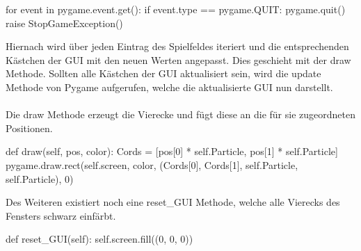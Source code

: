 \begin{python}
	for event in pygame.event.get():
		if event.type == pygame.QUIT:
			pygame.quit()
			raise StopGameException()
\end{python}
Hiernach wird über jeden Eintrag des Spielfeldes iteriert und die entsprechenden Kästchen der GUI mit den neuen Werten angepasst. Dies geschieht mit der draw Methode. Sollten alle Kästchen der GUI aktualisiert sein, wird die update Methode von Pygame aufgerufen, welche die aktualisierte GUI nun darstellt.\\
\\Die draw Methode erzeugt die Vierecke und fügt diese an die für sie zugeordneten Positionen.
\begin{python}
	def draw(self, pos, color):
		Cords = [pos[0] * self.Particle, pos[1] * self.Particle]
		pygame.draw.rect(self.screen, color, (Cords[0], Cords[1], self.Particle, self.Particle), 0)
\end{python}
Des Weiteren existiert noch eine reset\_GUI Methode, welche alle Vierecks des Fensters schwarz einfärbt.
\begin{python}
	def reset_GUI(self):
		self.screen.fill((0, 0, 0))
\end{python}

